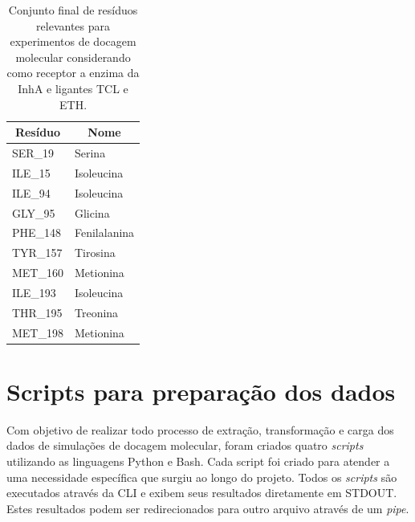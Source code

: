 \begin{table}[h]
\caption{Conjunto final de resíduos relevantes para experimentos de docagem molecular considerando como receptor a enzima da InhA e ligantes TCL e ETH.}
\label{tab:listaProvavelRelevantes}
\centering
\begin{tabular}{@{}ll@{}}
\toprule
\multicolumn{1}{c}{Resíduo} & \multicolumn{1}{c}{Nome} \\ \midrule
SER\_19                     & Serina                   \\
ILE\_15                     & Isoleucina               \\
ILE\_94                     & Isoleucina               \\
GLY\_95                     & Glicina                  \\
PHE\_148                    & Fenilalanina             \\
TYR\_157                    & Tirosina                 \\
MET\_160                    & Metionina                \\
ILE\_193                    & Isoleucina               \\
THR\_195                    & Treonina                 \\
MET\_198                    & Metionina                \\ \bottomrule
\end{tabular}
\end{table}

\section{Scripts para preparação dos dados}
\label{sec:ScriptsParaPreparacaoDosDados}

Com objetivo de realizar todo processo de extração, transformação e carga dos dados de simulações de docagem molecular, foram criados quatro \emph{scripts} utilizando as linguagens Python e Bash. Cada script foi criado para atender a uma necessidade específica que surgiu ao longo do projeto. Todos os \emph{scripts} são executados através da CLI e exibem seus resultados diretamente em STDOUT. Estes resultados podem ser redirecionados para outro arquivo através de um \emph{pipe}.


